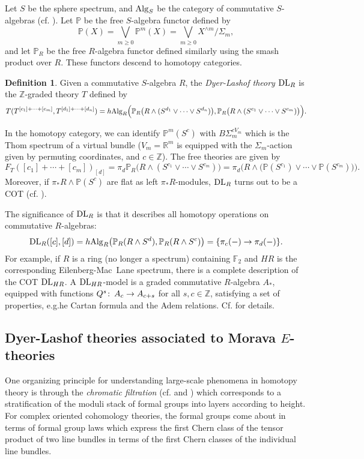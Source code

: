 \documentclass{gtpart}
\theoremstyle{definition}
\newtheorem{defn}[thm]{Definition}
\theoremstyle{remark}
\def\co{\colon\thinspace}
\newcommand{\mb}[1]{\mathbb{#1}}
\newcommand{\DL}{{\rm DL}}
\newcommand{\Alg}{{\rm Alg}}
\begin{document}
Let $S$ be the sphere 
spectrum, and $\Alg_S$ be the category of commutative $S$-algebras (cf. 
\cite{EKMM}).  Let $\mb P$ be the free $S$-algebra functor defined by 
\[
 {\mb P}(X) = \bigvee_{m \geq 0} {\mb P}^m(X) = \bigvee_{m \geq 0} 
 X^{\wedge m}/\Sigma_m,
\]
and let ${\mb P}_R$ be the free $R$-algebra functor 
defined similarly using the smash product over $R$.  These functors 
descend to homotopy categories.  
\begin{defn}
 Given a commutative $S$-algebra $R$, the {\em Dyer-Lashof theory} 
 $\DL_R$ is the $\mb Z$-graded theory $T$ defined by 
 \[
  T(T^{[c_1]+\cdots+[c_m]},T^{[d_1]+\cdots+[d_n]}) = h\Alg_R 
  \Big({\mb P}_R \big(R \wedge (S^{d_1} \vee \cdots \vee S^{d_n}) \big), 
  {\mb P}_R \big(R \wedge (S^{c_1} \vee \cdots \vee S^{c_m}) \big) \Big).
 \]
\end{defn}
In the homotopy category, we can identify ${\mb P}^m (S^c)$ with $B\Sigma_m^{cV_m}$ 
which is the Thom spectrum of a virtual bundle ($V_m = {\mb R}^m$ is equipped with the $\Sigma_m$-action given by 
permuting coordinates, and $c \in {\mb Z}$).  The free theories are given by 
\[
 F_T([c_1]+\cdots+[c_m])_{[d]} = \pi_d {\mb P}_R  \big( R \wedge (S^{c_1} 
 \vee \cdots \vee S^{c_m}) \big) = \pi_d \Big( R \wedge 
 \big({\mb P}(S^{c_1}) \vee \cdots \vee {\mb P}(S^{c_m})\big) \Big).
\]
Moreover, if $\pi_*R\wedge{\mb P}(S^c)$ are flat as left 
$\pi_*R$-modules, $\DL_R$ turns out to be a COT (cf. \cite[lemma 7.5]{lpo}).  

The significance of $\DL_R$ is 
that it describes all homotopy operations on commutative $R$-algebras: 
\[
 \DL_R([c],[d]) = h\Alg_R \big( {\mb P}_R(R \wedge S^d), 
 {\mb P}_R(R \wedge S^c) \big) = \{\pi_c(-) \to \pi_d(-)\}.
\]
For example, if $R$ is a ring (no longer a spectrum) containing 
${\mb F}_2$ and $HR$ is the corresponding Eilenberg-Mac~Lane spectrum, there is a complete description of the COT $\DL_{HR}$.  
A $\DL_{HR}$-model is a graded commutative $R$-algebra $A_*$, 
equipped with functions $Q^s\co A_c \to A_{c+s}$ for all 
$s, c \in {\mb Z}$, satisfying a set of properties, e.g.he 
Cartan formula and the Adem relations.  Cf. \cite[section 10]{lpo} for details.  


\subsection{Dyer-Lashof theories associated to Morava $E$-theories}
\label{subsec:DL}

One organizing principle for understanding large-scale phenomena in 
homotopy theory is through the {\em chromatic filtration} (cf. 
\cite{tafoverview} and \cite[section 17]{coctalos}) which corresponds to a stratification 
of the moduli stack of formal groups into layers according to height.  
For complex oriented cohomology theories, the formal groups come about in 
terms of formal group laws which express the first Chern class of the 
tensor product of two line bundles in terms of the first Chern classes of 
the individual line bundles.  
\end{document}
